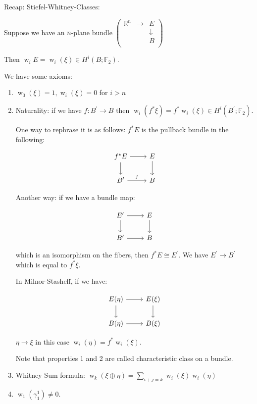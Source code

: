 \documentclass{article}
\theoremstyle{definition}
\begin{document}
    Recap: Stiefel-Whitney-Classes:

    Suppose we have an \(n\)-plane bundle \(\begin{pmatrix}
        \mathbb{R}^n & \to & E \\
         &  & \downarrow \\
         &  & B \\
    \end{pmatrix} \) 

    Then \(\operatorname{w}_i E = \operatorname{w}_i (\xi) \in H^i(B;\mathbb{F}_2)\).

    We have some axioms:

    \begin{enumerate}[label=\arabic*)]
        \item \(\operatorname{w}_0(\xi) = 1, \operatorname{w}_i(\xi) = 0\) for \(i > n\)
        \item Naturality: if we have \(f: B^{\prime} \to B\) then \(\operatorname{w}_i(f^{\ast} \xi) = f^{\ast} \operatorname{w}_i(\xi) \in H^i(B^{\prime} ; \mathbb{F}_2)\).
        
        One way to rephrase it is as follows: \(f^{\ast} E\) is the pullback bundle in the following:

        \[
            \begin{tikzcd}
                f^{\ast} E \ar[r] \ar[d] & E \ar[d] \\ B^{\prime} \ar[r,"f"] & B
            \end{tikzcd}
        \]

        Another way: if we have a bundle map:

        \[
            \begin{tikzcd}
                E^{\prime} \ar[r] \ar[d] & E \ar[d] \\ B^{\prime} \ar[r] & B
            \end{tikzcd}
        \]

        which is an isomorphism on the fibers, then \(f^{\ast} E \cong E^{\prime}\). We have \(E^{\prime} \to B^{\prime} \) which is equal to \(f^{\ast} \xi\).

        In Milnor-Stasheff, if we have:

        \[
            \begin{tikzcd}
                E(\eta) \ar[r] \ar[d] & E(\xi) \ar[d] \\ B(\eta) \ar[r] & B(\xi)
            \end{tikzcd}
        \]

        \(\eta \to \xi\) in this case \(\operatorname{w}_i(\eta) = f^{\ast} \operatorname{w}_i(\xi)\).

        Note that properties 1 and 2 are called characteristic class on a bundle.

        \item Whitney Sum formula: \(\operatorname{w}_k(\xi \oplus \eta) = \sum_{i+j=k} \operatorname{w}_i(\xi) \operatorname{w}_i(\eta)\)
        \item \(\operatorname{w}_1(\gamma^1_1) \neq 0\).
    \end{enumerate} 
\end{document}
